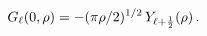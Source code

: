 \[\mathop{G_{\ell}\/}\nolimits\!\left(0,\rho\right)=-(\pi\rho/2)^{1/2}\mathop{Y_%
{\ell+\frac{1}{2}}\/}\nolimits\!\left(\rho\right).\]